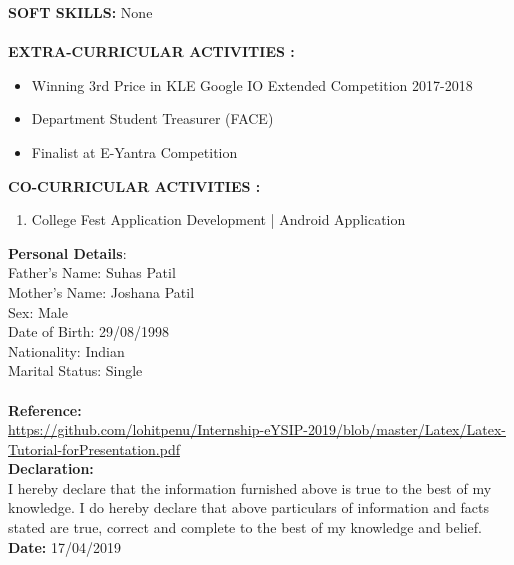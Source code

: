 \documentclass{article}
\begin{document}
\large \textbf{SOFT SKILLS:}	
None\\
\\
\large \textbf{EXTRA-CURRICULAR ACTIVITIES
:}\\
	\begin{itemize}
	\item Winning 3rd Price in KLE Google IO Extended Competition 2017-2018
	\item Department Student Treasurer (FACE)
	\item Finalist at E-Yantra Competition
\end{itemize}
\large \textbf{CO-CURRICULAR ACTIVITIES
:}\\
	\begin{enumerate}
	\item College Fest Application Development | Android Application
\end{enumerate}

\large \textbf{Personal Details}:\\
Father’s Name: Suhas Patil \\
Mother’s Name: Joshana Patil \\
Sex: Male \\
Date of Birth: 29/08/1998 \\
Nationality: Indian \\
Marital Status: Single \\
\\
\large \textbf{Reference:}\\
\href{Link}{https://github.com/lohitpenu/Internship-eYSIP-2019/blob/master/Latex/Latex-Tutorial-forPresentation.pdf} \\	

\large \textbf{Declaration: }\\
I hereby declare that the information furnished above is true to the best of my knowledge. I do hereby declare that above particulars of information and facts stated are true, correct and complete to the best of my knowledge and belief.\\

\large \textbf{Date: } 17/04/2019\\
\end{document}
